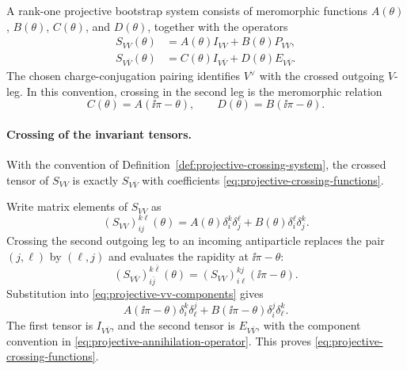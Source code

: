 \begin{definition}
\label{def:projective-crossing-system}
A rank-one projective bootstrap system consists of meromorphic functions
\(A(\theta)\), \(B(\theta)\), \(C(\theta)\), and \(D(\theta)\), together with
the operators
\begin{align}
  S_{VV}(\theta)&=A(\theta)I_{VV}+B(\theta)P_{VV},
  \label{eq:projective-vv-smatrix}\\
  S_{V\bar V}(\theta)&=C(\theta)I_{V\bar V}+D(\theta)E_{V\bar V}.
  \label{eq:projective-vbarv-smatrix}
\end{align}
The chosen charge-conjugation pairing identifies \(V^\vee\) with the crossed
outgoing \(V\)-leg.  In this convention, crossing in the second leg is the
meromorphic relation
\begin{equation}
  C(\theta)=A(\ii\pi-\theta),\qquad
  D(\theta)=B(\ii\pi-\theta).
  \label{eq:projective-crossing-functions}
\end{equation}
\end{definition}

\paragraph{Crossing of the invariant tensors.}
With the convention of Definition~\ref{def:projective-crossing-system}, the
crossed tensor of \(S_{VV}\) is exactly \(S_{V\bar V}\) with coefficients
\eqref{eq:projective-crossing-functions}.

Write matrix elements of \(S_{VV}\) as
\begin{equation}
  (S_{VV})_{ij}^{k\ell}(\theta)
  =
  A(\theta)\delta_i^k\delta_j^\ell
  +
  B(\theta)\delta_i^\ell\delta_j^k .
  \label{eq:projective-vv-components}
\end{equation}
Crossing the second outgoing leg to an incoming antiparticle replaces the pair
\((j,\ell)\) by \((\ell,j)\) and evaluates the rapidity at \(\ii\pi-\theta\):
\begin{equation}
  (S_{V\bar V})_{i\bar j}^{k\bar\ell}(\theta)
  =
  (S_{VV})_{i\ell}^{k j}(\ii\pi-\theta).
  \label{eq:projective-crossing-component-rule}
\end{equation}
Substitution into \eqref{eq:projective-vv-components} gives
\[
  A(\ii\pi-\theta)\delta_i^k\delta_\ell^j
  +
  B(\ii\pi-\theta)\delta_i^j\delta_\ell^k .
\]
The first tensor is \(I_{V\bar V}\), and the second tensor is
\(E_{V\bar V}\), with the component convention in
\eqref{eq:projective-annihilation-operator}.  This proves
\eqref{eq:projective-crossing-functions}.

